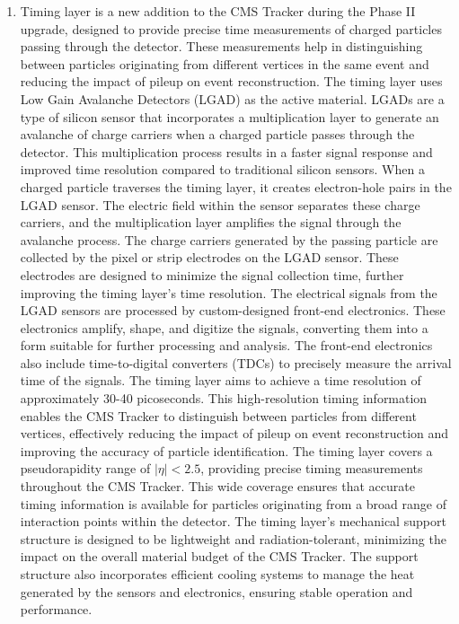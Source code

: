 \begin{enumerate}
\item Timing layer is a new addition to the CMS Tracker during the Phase II upgrade, designed to provide precise time measurements of charged particles passing through the detector. These measurements help in distinguishing between particles originating from different vertices in the same event and reducing the impact of pileup on event reconstruction. The timing layer uses Low Gain Avalanche Detectors (LGAD) as the active material. LGADs are a type of silicon sensor that incorporates a multiplication layer to generate an avalanche of charge carriers when a charged particle passes through the detector. This multiplication process results in a faster signal response and improved time resolution compared to traditional silicon sensors. When a charged particle traverses the timing layer, it creates electron-hole pairs in the LGAD sensor. The electric field within the sensor separates these charge carriers, and the multiplication layer amplifies the signal through the avalanche process. The charge carriers generated by the passing particle are collected by the pixel or strip electrodes on the LGAD sensor. These electrodes are designed to minimize the signal collection time, further improving the timing layer's time resolution. The electrical signals from the LGAD sensors are processed by custom-designed front-end electronics. These electronics amplify, shape, and digitize the signals, converting them into a form suitable for further processing and analysis. The front-end electronics also include time-to-digital converters (TDCs) to precisely measure the arrival time of the signals. The timing layer aims to achieve a time resolution of approximately 30-40 picoseconds. This high-resolution timing information enables the CMS Tracker to distinguish between particles from different vertices, effectively reducing the impact of pileup on event reconstruction and improving the accuracy of particle identification. The timing layer covers a pseudorapidity range of $|\eta| < 2.5$, providing precise timing measurements throughout the CMS Tracker. This wide coverage ensures that accurate timing information is available for particles originating from a broad range of interaction points within the detector. The timing layer's mechanical support structure is designed to be lightweight and radiation-tolerant, minimizing the impact on the overall material budget of the CMS Tracker. The support structure also incorporates efficient cooling systems to manage the heat generated by the sensors and electronics, ensuring stable operation and performance.


\end{enumerate}
